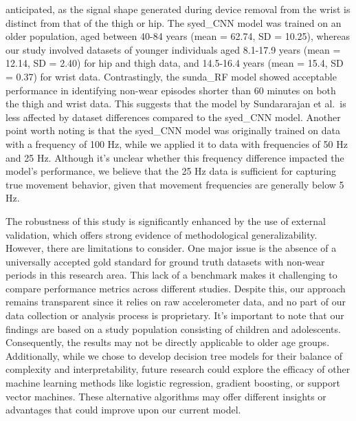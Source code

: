 \documentclass[
  10pt,
]{scrbook}
\begin{document}
anticipated, as the signal shape generated during device removal from
the wrist is distinct from that of the thigh or hip. The
\textsf{syed\_CNN} model was trained on an older population, aged
between 40-84 years (mean = 62.74, SD = 10.25), whereas our study
involved datasets of younger individuals aged 8.1-17.9 years (mean =
12.14, SD = 2.40) for hip and thigh data, and 14.5-16.4 years (mean =
15.4, SD = 0.37) for wrist data. Contrastingly, the \textsf{sunda\_RF}
model showed acceptable performance in identifying non-wear episodes
shorter than 60 minutes on both the thigh and wrist data. This suggests
that the model by Sundararajan et al.~is less affected by dataset
differences compared to the \textsf{syed\_CNN} model. Another point
worth noting is that the \textsf{syed\_CNN} model was originally trained
on data with a frequency of 100 Hz, while we applied it to data with
frequencies of 50 Hz and 25 Hz. Although it's unclear whether this
frequency difference impacted the model's performance, we believe that
the 25 Hz data is sufficient for capturing true movement behavior, given
that movement frequencies are generally below 5 Hz.

The robustness of this study is significantly enhanced by the use of
external validation, which offers strong evidence of methodological
generalizability. However, there are limitations to consider. One major
issue is the absence of a universally accepted gold standard for ground
truth datasets with non-wear periods in this research area. This lack of
a benchmark makes it challenging to compare performance metrics across
different studies. Despite this, our approach remains transparent since
it relies on raw accelerometer data, and no part of our data collection
or analysis process is proprietary. It's important to note that our
findings are based on a study population consisting of children and
adolescents. Consequently, the results may not be directly applicable to
older age groups. Additionally, while we chose to develop decision tree
models for their balance of complexity and interpretability, future
research could explore the efficacy of other machine learning methods
like logistic regression, gradient boosting, or support vector machines.
These alternative algorithms may offer different insights or advantages
that could improve upon our current model.
\end{document}
